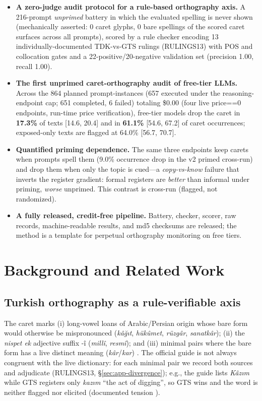 \documentclass[11pt]{article}
\begin{document}
\begin{itemize}
\item \textbf{A zero-judge audit protocol for a rule-based orthography axis.} A 216-prompt \emph{unprimed} battery in which the evaluated spelling is never shown (mechanically asserted: 0 caret glyphs, 0 bare spellings of the scored caret surfaces across all prompts), scored by a rule checker encoding 13 individually-documented TDK-vs-GTS rulings (RULINGS13) with POS and collocation gates and a 22-positive/20-negative validation set (precision 1.00, recall 1.00).
\item \textbf{The first unprimed caret-orthography audit of free-tier LLMs.} Across the 864 planned prompt-instances (657 executed under the reasoning-endpoint cap; 651 completed, 6 failed) totaling \$0.00 (four live price==0 endpoints, run-time price verification), free-tier models drop the caret in \textbf{17.3\%} of texts [14.6, 20.4] and in \textbf{61.1\%} [54.6, 67.2] of caret occurrences; exposed-only texts are flagged at 64.0\% [56.7, 70.7].
\item \textbf{Quantified priming dependence.} The same three endpoints keep carets when prompts spell them (9.0\% occurrence drop in the v2 primed cross-run) and drop them when only the topic is cued---a \emph{copy-vs-know} failure that inverts the register gradient: formal registers are \emph{better} than informal under priming, \emph{worse} unprimed. This contrast is cross-run (flagged, not randomized).
\item \textbf{A fully released, credit-free pipeline.} Battery, checker, scorer, raw records, machine-readable results, and md5 checksums are released; the method is a template for perpetual orthography monitoring on free tiers.
\end{itemize}

\section{Background and Related Work}

\subsection{Turkish orthography as a rule-verifiable axis}

The caret marks (i) long-vowel loans of Arabic/Persian origin whose bare form would otherwise be mispronounced (\emph{k{\^a}{\u{g}}{\i}t}, \emph{h{\"u}k{\^u}met}, \emph{r{\"u}zg{\^a}r}, \emph{sanatk{\^a}r}); (ii) the \emph{nispet ek} adjective suffix -{\^i} (\emph{mill{\^i}}, \emph{resm{\^i}}); and (iii) minimal pairs where the bare form has a live distinct meaning (\emph{k{\^a}r}/\emph{kar}) \cite{tdk2012}. The official guide is not always congruent with the live dictionary: for each minimal pair we record both sources and adjudicate (RULINGS13, \S\ref{sec:app-divergence}); e.g., the guide lists \emph{K{\^a}z{\i}m} while GTS registers only \emph{kaz{\i}m} ``the act of digging'', so GTS wins and the word is neither flagged nor elicited (documented tension \cite{tdk2012,gts2026}).
\end{document}

